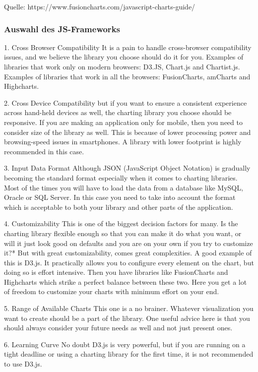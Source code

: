 Quelle: https://www.fusioncharts.com/javascript-charts-guide/

\subsubsection{Auswahl des JS-Frameworks}

1. Cross Browser Compatibility
It is a pain to handle cross-browser compatibility issues, and we believe the library you choose should do it for you.
Examples of libraries that work only on modern browsers: D3.JS, Chart.js and Chartist.js.
Examples of libraries that work in all the browsers: FusionCharts, amCharts and Highcharts.

2. Cross Device Compatibility
but if you want to ensure a consistent experience across hand-held devices as well, the charting library you choose should be responsive.
If you are making an application only for mobile, then you need to consider size of the library as well. This is because of lower processing power and browsing-speed issues in smartphones. A library with lower footprint is highly recommended in this case.

3. Input Data Format
Although JSON (JavaScript Object Notation) is gradually becoming the standard format especially when it comes to charting libraries. Most of the times you will have to load the data from a database like MySQL, Oracle or SQL Server. In this case you need to take into account the format which is acceptable to both your library and other parts of the application.

4. Customizability
This is one of the biggest decision factors for many. Is the charting library flexible enough so that you can make it do what you want, or will it just look good on defaults and you are on your own if you try to customize it?*
But with great customizability, comes great complexities. A good example of this is D3.js. It practically allows you to configure every element on the chart, but doing so is effort intensive. Then you have libraries like FusionCharts and Highcharts which strike a perfect balance between these two. Here you get a lot of freedom to customize your charts with minimum effort on your end.

5. Range of Available Charts
This one is a no brainer. Whatever visualization you want to create should be a part of the library. One useful advice here is that you should always consider your future needs as well and not just present ones.


6. Learning Curve
No doubt D3.js is very powerful, but if you are running on a tight deadline or using a charting library for the first time, it is not recommended to use D3.js.


